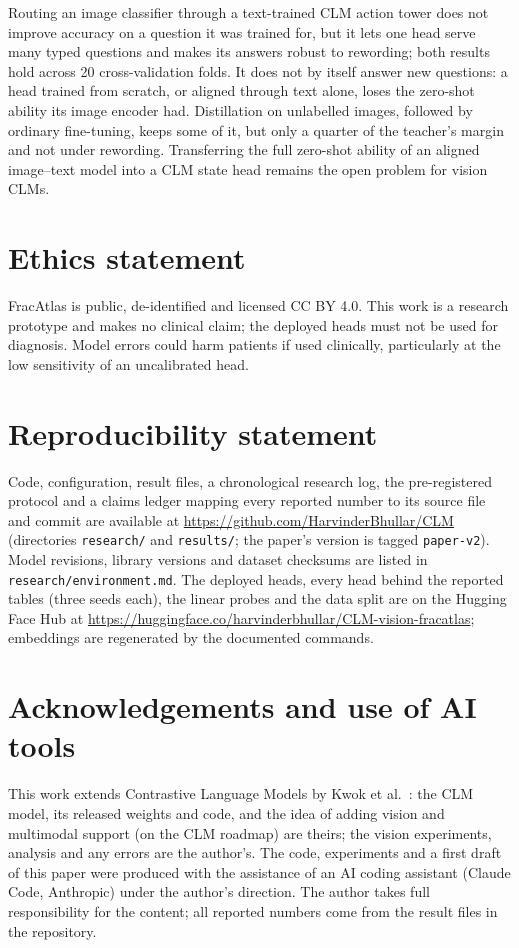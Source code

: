 \documentclass[11pt]{article}
\begin{document}
Routing an image classifier through a text-trained CLM action tower does not improve accuracy on a question it was
trained for, but it lets one head serve many typed questions and makes its answers robust to rewording; both results
hold across 20 cross-validation folds. It does not by itself answer new questions: a head trained from scratch, or
aligned through text alone, loses the zero-shot ability its image encoder had. Distillation on unlabelled images,
followed by ordinary fine-tuning, keeps some of it, but only a quarter of the teacher's margin and not under
rewording. Transferring the full zero-shot ability of an aligned image--text model into a CLM state head remains the
open problem for vision CLMs.

\section*{Ethics statement}
FracAtlas is public, de-identified and licensed CC BY 4.0. This work is a research prototype and makes no clinical
claim; the deployed heads must not be used for diagnosis. Model errors could harm patients if used clinically,
particularly at the low sensitivity of an uncalibrated head.

\section*{Reproducibility statement}
\sloppy
Code, configuration, result files, a chronological research log, the pre-registered protocol and a claims ledger
mapping every reported number to its source file and commit are available at
\url{https://github.com/HarvinderBhullar/CLM} (directories \texttt{research/} and \texttt{results/}; the
paper's version is tagged \texttt{paper-v2}). Model revisions, library versions and dataset checksums are listed in
\texttt{research/environment.md}. The deployed heads, every head behind the reported tables (three seeds each),
the linear probes and the data split are on the Hugging Face Hub at
\url{https://huggingface.co/harvinderbhullar/CLM-vision-fracatlas}; embeddings are regenerated by the documented
commands.

\fussy
\section*{Acknowledgements and use of AI tools}
This work extends Contrastive Language Models by Kwok et al.\ \citep{kwok2026clm}: the CLM model, its released
weights and code, and the idea of adding vision and multimodal support (on the CLM roadmap) are theirs; the vision
experiments, analysis and any errors are the author's.
The code, experiments and a first draft of this paper were produced with the assistance of an AI coding assistant
(Claude Code, Anthropic) under the author's direction. The author takes full responsibility for the content; all
reported numbers come from the result files in the repository.
\end{document}
